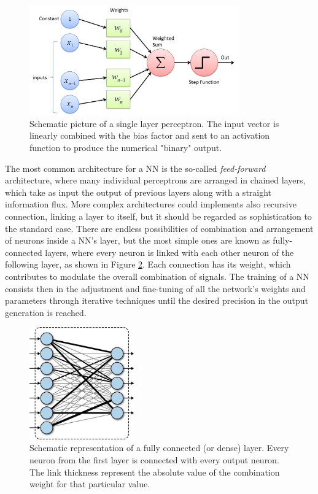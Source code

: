 \begin{figure}
    \centering
    \includegraphics[width = 0.8\textwidth]{images/perceptron}
    \caption{Schematic picture of a single layer perceptron. The input vector is linearly combined with the bias factor and sent to an activation function to produce the numerical "binary" output.}
    \label{fig:perceptron}
\end{figure}

The most common architecture for a NN is the so-called \textit{feed-forward} architecture, where many individual perceptrons are arranged in chained layers, which take as input the output of previous layers along with a straight information flux. More complex architectures could implements also recursive connection, linking a layer to itself, but it should be regarded as sophistication to the standard case. There are endless possibilities of combination and arrangement of neurons inside a NN's layer, but the most simple ones are known as fully-connected layers, where every neuron is linked with each other neuron of the following layer, as shown in Figure \ref{fig:fully_connected}. Each connection has its weight, which contributes to modulate the overall combination of signals. The training of a NN consists then in the adjustment and fine-tuning of all the network's weights and parameters through iterative techniques until the desired precision in the output generation is reached.

\begin{figure}
    \centering
    \includegraphics[width = 0.4\textwidth]{images/fully_connected}
    \caption{Schematic representation of a fully connected (or dense) layer. Every neuron from the first layer is connected with every output neuron. The link thickness represent the absolute value of the combination weight for that particular value. }
    \label{fig:fully_connected}
\end{figure}

